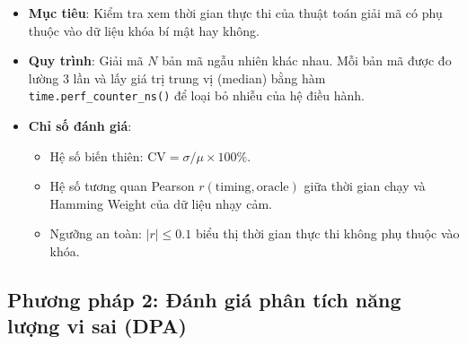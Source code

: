 \documentclass[../LuanVan.tex]{subfiles}
\begin{document}
\begin{itemize}[leftmargin=2cm]
    \item \textbf{Mục tiêu}: Kiểm tra xem thời gian thực thi của thuật toán giải mã có phụ thuộc vào dữ liệu khóa bí mật hay không.
    \item \textbf{Quy trình}: Giải mã $N$ bản mã ngẫu nhiên khác nhau. Mỗi bản mã được đo lường 3 lần và lấy giá trị trung vị (median) bằng hàm \texttt{time.perf_counter\_ns()} để loại bỏ nhiễu của hệ điều hành.
    \item \textbf{Chỉ số đánh giá}:
    \begin{itemize}
        \item Hệ số biến thiên: $\text{CV} = \sigma / \mu \times 100\%$.
        \item Hệ số tương quan Pearson $r(\text{timing}, \text{oracle})$ giữa thời gian chạy và Hamming Weight của dữ liệu nhạy cảm.
        \item Ngưỡng an toàn: $|r| \leq 0.1$ biểu thị thời gian thực thi không phụ thuộc vào khóa.
    \end{itemize}
\end{itemize}

\subsection{Phương pháp 2: Đánh giá phân tích năng lượng vi sai (DPA)}
\end{document}
